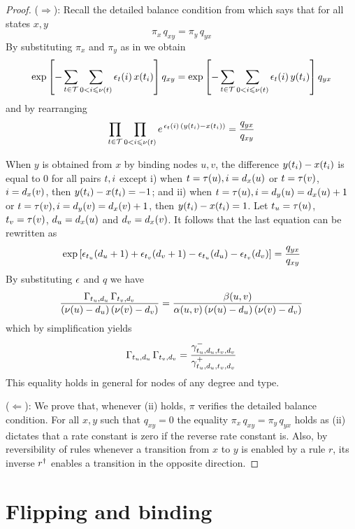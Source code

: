 \begin{proof}
  ($\Rightarrow$):
  Recall the detailed balance condition
  from 
  which says that for all states $x,y$
  \[ \pi_x \, q_{xy} = \pi_y \, q_{yx} \]
  By substituting $\pi_x$ and $\pi_y$ as in  we obtain
  \begin{equation*}
    \operatorname*{exp}\left[
      -\sum_{t \in \mathcal{T}} \sum_{0 < i \leqslant \nu(t)}
      \epsilon_t(i) \, x(t_i)
    \right] q_{xy} =
    \operatorname*{exp}\left[
      -\sum_{t \in \mathcal{T}} \sum_{0 < i \leqslant \nu(t)}
      \epsilon_t(i) \, y(t_i)
    \right] q_{yx}
  \end{equation*}
  and by rearranging
  \[ \prod_{t \in \mathcal{T}} \prod_{0 < i \leqslant \nu(t)}
     e^{\,\epsilon_t(i) \, (y(t_i) - x(t_i))} =
     \frac{q_{yx}}{q_{xy}} \]

  When $y$ is obtained from $x$ by binding nodes $u,v$,
  the difference $y(t_i) - x(t_i)$ is equal to $0$
  for all pairs $t, i$ except
  i) when $t = \tau(u), i = d_x(u)$
  or $t = \tau(v)$, $i = d_x(v)$,
  then $y(t_i) - x(t_i) = -1$; and
  ii) when $t = \tau(u), i = d_y(u) = d_x(u) + 1$
  or $t = \tau(v), i = d_y(v) = d_x(v) + 1$,
  then $y(t_i) - x(t_i) = 1$.
  Let $t_u = \tau(u)$, $t_v = \tau(v)$,
  $d_u = d_x(u)$ and $d_v = d_x(v)$.
  It follows that the last equation can be rewritten as
  \[ \operatorname*{exp}\left[
       \epsilon_{t_u}(d_u+1) +
       \epsilon_{t_v}(d_v+1) -
       \epsilon_{t_u}(d_u) -
       \epsilon_{t_v}(d_v) \right] =
     \frac{q_{yx}}{q_{xy}} \]
  By substituting $\epsilon$ and $q$ we have
  \[ \frac{
       \Gamma_{t_u,d_u} \, \Gamma_{t_v,d_v}}{
       (\nu(u) - d_u) \, (\nu(v) - d_v)} =
     \frac{
       \beta(u,v)}{
       \alpha(u,v) \, (\nu(u) - d_u) \, (\nu(v) - d_v)} \]
  which by simplification yields
  \[ \Gamma_{t_u,d_u} \, \Gamma_{t_v,d_v} =
    \frac{\gamma^-_{t_u,d_u,t_v,d_v}}{\gamma^+_{t_u,d_u,t_v,d_v}} \]
  This equality holds in general for nodes of any degree and type.

  ($\Leftarrow$):
  We prove that, whenever (ii) holds,
  $\pi$ verifies the detailed balance condition.
  For all $x,y$ such that $q_{xy} = 0$
  the equality $\pi_x\,q_{xy} = \pi_y\,q_{yx}$ holds
  as (ii) dictates that
  a rate constant is zero if the reverse rate constant is.
  Also, by reversibility of rules
  whenever a transition from $x$ to $y$ is enabled by a rule $r$,
  its inverse $r^\dagger$ enables a transition in the opposite direction.
\end{proof}


\section{Flipping and binding} %
\label{sec:fb}
\fi







